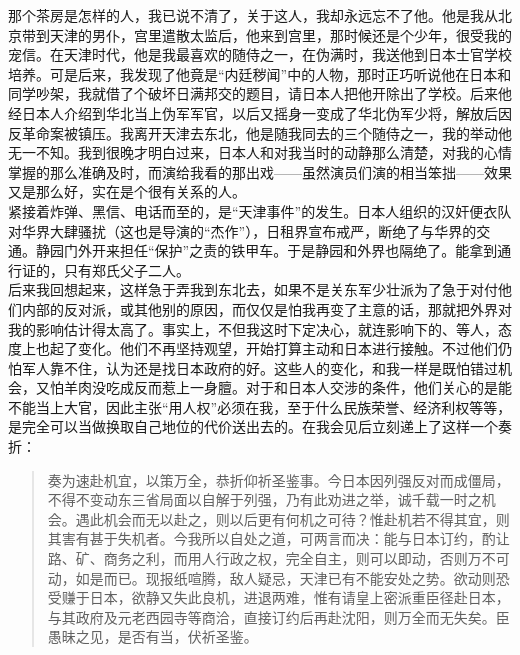 那个茶房是怎样的人，我已说不清了，关于这人，我却永远忘不了他。他是我从北京带到天津的男仆，宫里遣散太监后，他来到宫里，那时候还是个少年，很受我的宠信。在天津时代，他是我最喜欢的随侍之一，在伪满时，我送他到日本士官学校培养。可是后来，我发现了他竟是“内廷秽闻”中的人物，那时正巧听说他在日本和同学吵架，我就借了个破坏日满邦交的题目，请日本人把他开除出了学校。后来他经日本人介绍到华北当上伪军军官，以后又摇身一变成了华北伪军少将，解放后因反革命案被镇压。我离开天津去东北，他是随我同去的三个随侍之一，我的举动他无一不知。我到很晚才明白过来，日本人和对我当时的动静那么清楚，对我的心情掌握的那么准确及时，而演给我看的那出戏——虽然演员们演的相当笨拙——效果又是那么好，实在是个很有关系的人。\\

紧接着炸弹、黑信、电话而至的，是“天津事件”的发生。日本人组织的汉奸便衣队对华界大肆骚扰（这也是导演的“杰作”），日租界宣布戒严，断绝了与华界的交通。静园门外开来担任“保护”之责的铁甲车。于是静园和外界也隔绝了。能拿到通行证的，只有郑氏父子二人。\\

后来我回想起来，这样急于弄我到东北去，如果不是关东军少壮派为了急于对付他们内部的反对派，或其他别的原因，而仅仅是怕我再变了主意的话，那就把外界对我的影响估计得太高了。事实上，不但我这时下定决心，就连影响下的、等人，态度上也起了变化。他们不再坚持观望，开始打算主动和日本进行接触。不过他们仍怕军人靠不住，认为还是找日本政府的好。这些人的变化，和我一样是既怕错过机会，又怕羊肉没吃成反而惹上一身膻。对于和日本人交涉的条件，他们关心的是能不能当上大官，因此主张“用人权”必须在我，至于什么民族荣誉、经济利权等等，是完全可以当做换取自己地位的代价送出去的。在我会见后立刻递上了这样一个奏折：\\

\begin{quote}
	奏为速赴机宜，以策万全，恭折仰祈圣鉴事。今日本因列强反对而成僵局，不得不变动东三省局面以自解于列强，乃有此劝进之举，诚千载一时之机会。遇此机会而无以赴之，则以后更有何机之可待？惟赴机若不得其宜，则其害有甚于失机者。今我所以自处之道，可两言而决：能与日本订约，酌让路、矿、商务之利，而用人行政之权，完全自主，则可以即动，否则万不可动，如是而已。现报纸喧腾，敌人疑忌，天津已有不能安处之势。欲动则恐受赚于日本，欲静又失此良机，进退两难，惟有请皇上密派重臣径赴日本，与其政府及元老西园寺等商洽，直接订约后再赴沈阳，则万全而无失矣。臣愚昧之见，是否有当，伏祈圣鉴。\\
\end{quote}
